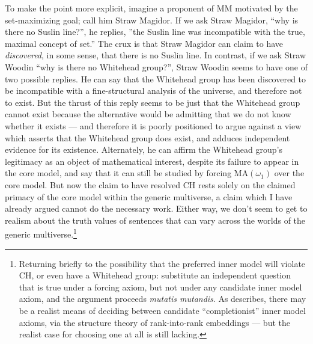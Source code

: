 \documentclass[letterpaper,12pt]{article}
\begin{document}


To make the point more explicit, imagine a proponent of MM motivated by the set-maximizing goal; call him Straw Magidor. If we ask Straw Magidor, ``why is there no Suslin line?'', he replies, ''the Suslin line was incompatible with the true, maximal concept of set.'' The crux is that Straw Magidor can claim to have \emph{discovered}, in some sense, that there is no Suslin line. In contrast, if we ask Straw Woodin ``why is there no Whitehead group?'', Straw Woodin seems to have one of two possible replies. He can say that the Whitehead group has been discovered to be incompatible with a fine-structural analysis of the universe, and therefore not to exist. But the thrust of this reply seems to be just that the Whitehead group cannot exist because the alternative would be admitting that we do not know whether it exists --- and therefore it is poorly positioned to argue against a view which asserts that the Whitehead group does exist, and adduces independent evidence for its existence. Alternately, he can affirm the Whitehead group's legitimacy as an object of mathematical interest, despite its failure to appear in the core model, and say that it can still be studied by forcing $\mathrm{MA}(\omega_1)$ over the core model. But now the claim to have resolved CH rests solely on the claimed primacy of the core model within the generic multiverse, a claim which I have already argued cannot do the necessary work. Either way, we don't seem to get to realism about the truth values of sentences that can vary across the worlds of the generic multiverse.\footnote{Returning briefly to the possibility that the preferred inner model will violate CH, or even have a Whitehead group: substitute an independent question that is true under a forcing axiom, but not under any candidate inner model axiom, and the argument proceeds \emph{mutatis mutandis}. As \cite{sep-continuum-hypothesis} describes, there may be a realist means of deciding between candidate ``completionist'' inner model axioms, via the structure theory of rank-into-rank embeddings --- but the realist case for choosing one at all is still lacking.}
\end{document}
